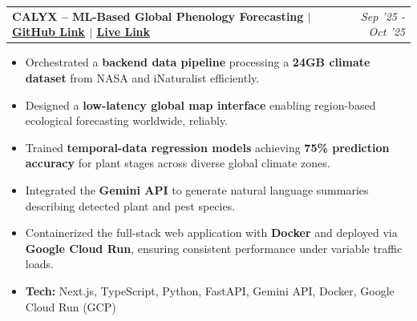 \documentclass[a4paper, 10pt]{article}
\makeatletter
\newcommand{\cvlink}[2]{\href{#1}{\textcolor{headerblue}{\uline{#2}}}}
\newcommand{\projectentry}[2]{
    \noindent\begin{tabularx}{\linewidth}{@{} X r @{}}
        \textbf{\color{headerblue}#1} & \textit{#2} \\
    \end{tabularx}
    \par\vspace{2pt}
}
\makeatother
\begin{document}
\projectentry{CALYX – ML-Based Global Phenology Forecasting $|$ \cvlink{https://github.com/Dhruv1249/Plant-Phenology-State-Detector}{GitHub Link} $|$ \cvlink{https://plant-phenology-state-detector.vercel.app/}{Live Link}}{Sep '25 - Oct '25}
\begin{itemize}
\item Orchestrated a \textbf{backend data pipeline} processing a \textbf{24GB climate dataset} from NASA and iNaturalist efficiently.
\item Designed a \textbf{low-latency global map interface} enabling region-based ecological forecasting worldwide, \hspace{0.5em} reliably.
\item Trained \textbf{temporal-data regression models} achieving \textbf{75\% prediction accuracy} for plant stages across diverse global climate zones.
\item Integrated the \textbf{Gemini API} to \hspace{0.33em}  generate natural language \hspace{0.33em}  summaries describing detected plant and pest \hspace{0.33em} species.
\item Containerized the full-stack web application with \textbf{Docker} and deployed via \textbf{Google Cloud Run}, ensuring consistent performance under variable traffic loads.
\item[]\textbf{Tech:} Next.js, TypeScript, Python, FastAPI, Gemini API, Docker, Google Cloud Run (GCP)
\end{itemize}
\endgroup





\end{document}
